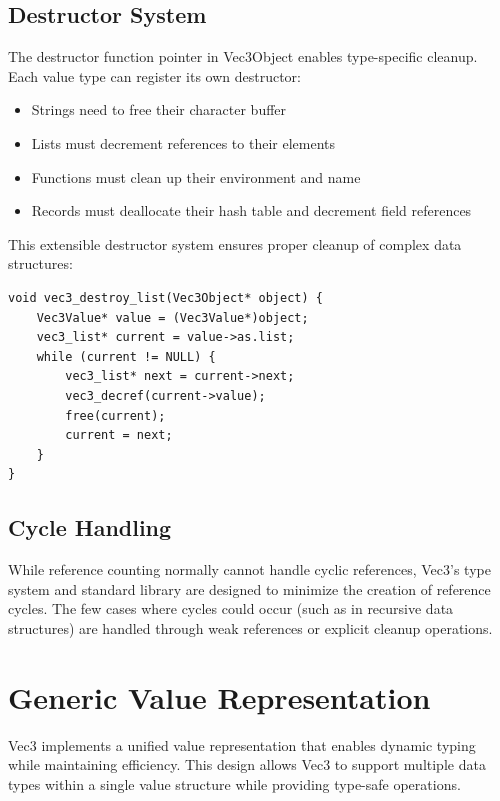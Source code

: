 \subsection{Destructor System}\label{subsec:destructor-system}
The destructor function pointer in Vec3Object enables type-specific cleanup.
Each value type can register its own destructor:

\begin{itemize}[nolistsep]
\item Strings need to free their character buffer
\item Lists must decrement references to their elements
\item Functions must clean up their environment and name
\item Records must deallocate their hash table and decrement field references
\end{itemize}

This extensible destructor system ensures proper cleanup of complex data structures:

\begin{verbatim}
void vec3_destroy_list(Vec3Object* object) {
    Vec3Value* value = (Vec3Value*)object;
    vec3_list* current = value->as.list;
    while (current != NULL) {
        vec3_list* next = current->next;
        vec3_decref(current->value);
        free(current);
        current = next;
    }
}
\end{verbatim}

\subsection{Cycle Handling}\label{subsec:cycle-handling}
While reference counting normally cannot handle cyclic references, Vec3's type system and standard library are designed to minimize the creation of reference cycles.
The few cases where cycles could occur (such as in recursive data structures) are handled through weak references or explicit cleanup operations.

\section{Generic Value Representation}\label{sec:generic-value}

Vec3 implements a unified value representation that enables dynamic typing while maintaining efficiency.
This design allows Vec3 to support multiple data types within a single value structure while providing type-safe operations.


